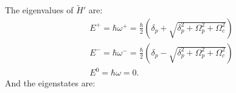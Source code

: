 \documentclass{article}
\theoremstyle{definition}
\begin{document}
The eigenvalues of $\tilde{H}'$ are:
\begin{align}
&E^+ = \hbar\omega^+ = \frac{\hbar}{2}\left( \delta_p + \sqrt{\delta^2_p + \Omega^2_p + \Omega^2_c}\right) \nonumber\\
&E^- = \hbar\omega^- = \frac{\hbar}{2}\left( \delta_p - \sqrt{\delta^2_p + \Omega^2_p + \Omega^2_c}\right) \nonumber\\
&E^0 = \hbar\omega = 0.
\end{align}
And the eigenstates are:
\begin{align}

\end{align}











	
\end{document}
